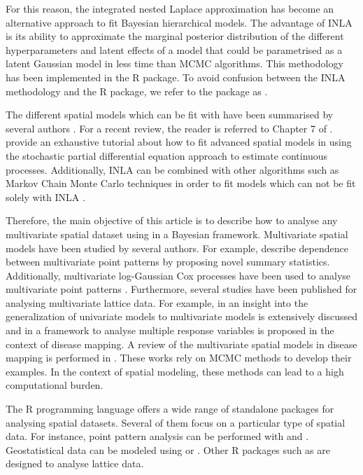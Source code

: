\medskip
For this reason, the integrated nested Laplace approximation \citep[INLA, ][]{INLA} has become an alternative approach to fit Bayesian hierarchical models. The advantage of INLA is its ability to approximate the marginal posterior distribution of the different hyperparameters and latent effects of a model that could be parametrised as a latent Gaussian model \citep{rueheld:2005} in less time than MCMC algorithms. This methodology has been implemented in the  R package. To avoid confusion between the INLA methodology and the  R package, we refer to the package as  \citep{RINLA}. 

\medskip
The different spatial models which can be fit with  have been summarised by several authors
\citep{LindgrenRue2015, BlangiardoCameletti, Bakkaetal:2018}. For a recent review, the reader is referred to Chapter 7 of \citet{gomez2020bayesian}. \citet{Krainskietal:2019} provide an exhaustive tutorial about how to fit advanced spatial models in  using the stochastic partial differential equation approach \citep[SPDE, ][]{SPDE} to estimate continuous processes. Additionally, INLA can be combined with other algorithms such as Markov Chain Monte Carlo \citep[MCMC, ][]{MCMC} techniques in order to fit models which can not be fit solely with INLA \citep{GomezRubioPalmiPerales:2018}.

\medskip
Therefore, the main objective of this article is to describe how to analyse any multivariate spatial dataset using  in a Bayesian framework.
Multivariate spatial models have been studied by several authors. For example, \citet{VanLieshout1999} describe dependence between multivariate point patterns  by proposing novel summary statistics. Additionally, multivariate log-Gaussian Cox processes have been used to analyse multivariate point patterns \citep{DiggleMoraga, WaagerMultLogGau, gomez2015analysis}.
Furthermore, several studies have been published for analysing multivariate lattice data. For example, in \citet{macnab2018} an insight into the generalization of univariate models to multivariate models is extensively discussed and in \citet{martinez2017} a framework to analyse multiple response variables is proposed in the context of disease mapping. A review of the multivariate spatial models in disease mapping is performed in \citet{LibroMigue}. These works rely on MCMC methods to develop their examples. In the context of spatial modeling, these methods can lead to a high computational burden.


\medskip
The R programming \citep{r:2022} language offers a wide range of standalone packages for analysing spatial datasets. Several of them focus on a particular type of spatial data. For instance, point pattern analysis can be performed with  \citep{spatstat:2015} and  \citep{spatialkernel}. Geostatistical data can be modeled using  \citep{gstat, gstatRpackage} or  \citep{spBayes, spBayes2}. Other R packages such as  \citep{CARBayes} are designed to analyse lattice data.


